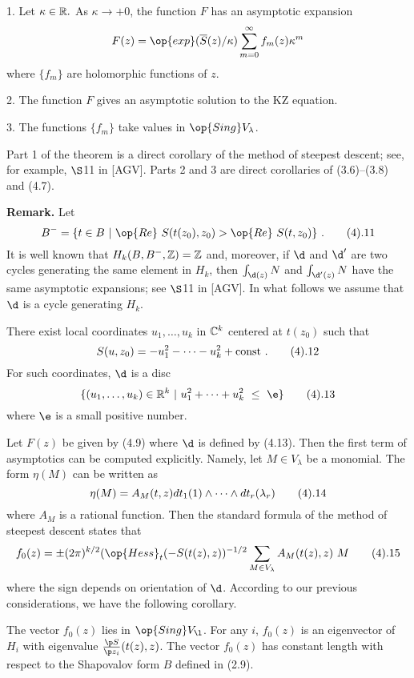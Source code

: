 
 1. Let $\kappa \in \Bbb R.$
As $\kappa \to +0$, the function $F$ has an
asymptotic expansion
$$
F(z) = {\op{exp}}(\overline S(z)/ \kappa) \sum^\infty_{m=0}
f_m(z)\kappa^m
$$
where $\{ f_m\}$ are holomorphic functions of $z$.

2. The function $F$ gives an asymptotic solution to the KZ equation.

3. The functions $\{ f_m\}$ take values in ${\op{Sing }} V_\lambda$.
\endproclaim

Part 1 of the theorem is a direct corollary of the method of steepest
descent; see, for example, $\S$11 in [AGV].  Parts 2 and 3 are direct
corollaries of (3.6)--(3.8) and (4.7).

{\bf Remark. } Let
$$
B^- = \{ t\in B \ |\ {\op{Re }}\  S(t(z_0),z_0)
 > {\op{Re }} \  S(t,z_0)\} \ .
    \tag 4.11
$$
It is well known that $H_k(B,B^-,\Bbb Z)=\Bbb Z$ and, moreover, if
$\d$ and $\d'$ are two cycles generating the same element in $H_k$,
then $\int_{\d(z)} N$ and $\int_{\d'(z)}N$ have the same asymptotic
expansions; see $\S$11 in [AGV]. In what follows we assume that $\d$
is a cycle generating $H_k$.

\bigskip
There exist local coordinates $u_1,\dots ,u_k$ in $\Bbb C^k$ centered
at $t(z_0)$ such that
$$
S(u,z_0) = -u^2_1 - \dots -u^2_k + {\text {const}} \ .   \tag 4.12
$$
For such coordinates, $\d$ is a disc
$$
\{ (u_1,\dots ,u_k)\in\Bbb R^k \ |\  u^2_1 +\dots +u^2_k\ \leq \ \e\}
   \tag 4.13
$$
where $\e$ is a small positive number.

\bigskip\bigskip
{}

Let $F(z)$ be given by (4.9) where $\d$ is defined by (4.13). Then the
first term of asymptotics can be computed explicitly. Namely, let
$M\in V_\lambda$ be a monomial. The form $\eta (M)$ can be written as
$$
\eta (M) = A_M(t,z)dt_1(1)\wedge\dots\wedge dt_r(\lambda_r)
\tag 4.14
$$
where $A_M$ is a rational function. Then the standard formula of the
method of steepest descent states that
$$
f_0(z) = \pm(2\pi)^{k/2} ({\op{Hess}}_t(-S(t(z),z))^{-1/2}
\sum_{M\in V_\lambda} A_M(t(z),z)\ M   \tag 4.15
$$
where the sign depends on  orientation of $\d$.
According to our previous considerations, we have the following
corollary.


 The vector $f_0(z)$ lies in
${\op{Sing }} V_\l$. For any $i$, $f_0(z)$ is an eigenvector of $H_i$ with
eigenvalue $\frac{\p S}{\p z_i}(t(z),z)$.
The vector $f_0(z)$ has constant length with respect to the
Shapovalov form $B$ defined in (2.9).
\endproclaim

